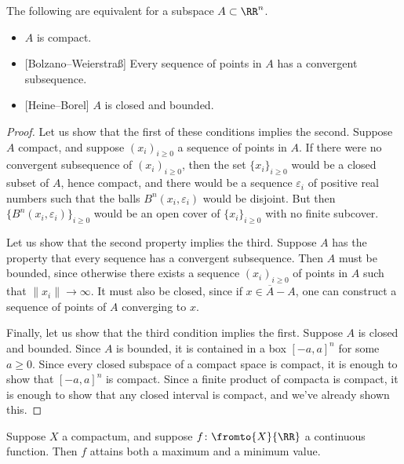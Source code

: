 \begin{thm}\label{thm:heineborel}
	The following are equivalent for a subspace $A\subset\RR^n$.
	\begin{itemize}
		\item $A$ is compact.
		\item {[Bolzano--Weierstra{\ss}]} Every sequence of points in $A$ has a convergent subsequence.
		\item {[Heine--Borel]} $A$ is closed and bounded.
	\end{itemize}
\end{thm}
\begin{proof}
	Let us show that the first of these conditions implies the second.
	Suppose $A$ compact, and suppose $(x_i)_{i\geq 0}$ a sequence of points in $A$.
	If there were no convergent subsequence of $(x_i)_{i\geq 0}$, then the set $\{x_i\}_{i\geq 0}$ would be a closed subset of $A$, hence compact, and
	there would be a sequence $\varepsilon_i$ of positive real numbers such that the balls $B^n(x_i,\varepsilon_i)$ would be disjoint.
	But then $\{B^n(x_i,\varepsilon_i)\}_{i\geq 0}$ would be an open cover of $\{x_i\}_{i\geq 0}$ with no finite subcover.

	Let us show that the second property implies the third.
	Suppose $A$ has the property that every sequence has a convergent subsequence.
	Then $A$ must be bounded, since otherwise there exists a sequence $(x_i)_{i\geq 0}$ of points in $A$ such that $\|x_i\|\to\infty$.
	It must also be closed, since if $x\in\overline{A}-A$, one can construct a sequence of points of $A$ converging to $x$.

	Finally, let us show that the third condition implies the first.
	Suppose $A$ is closed and bounded.
	Since $A$ is bounded, it is contained in a box $[-a,a]^n$ for some $a\geq 0$.
	Since every closed subspace of a compact space is compact, it is enough to show that $[-a,a]^n$ is compact.
	Since a finite product of compacta is compact, it is enough to show that any closed interval is compact, and we've already shown this.
\end{proof}

\begin{cor}
	Suppose $X$ a compactum, and suppose $f\colon\fromto{X}{\RR}$ a continuous function.
	Then $f$ attains both a maximum and a minimum value.
\end{cor}

